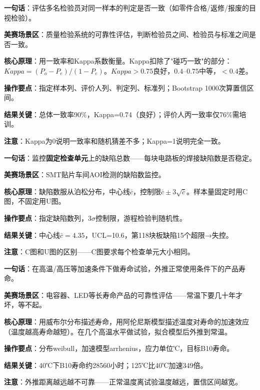 
\begin{algobrief}
\textbf{一句话}：评估多名检验员对同一样本的判定是否一致（如零件合格/返修/报废的目视检验）。

\textbf{美赛场景区}：质量检验系统的可靠性评估，判断检验员之间、检验员与标准之间是否一致。

\textbf{核心原理}：用一致率和Kappa系数衡量。Kappa扣除了"碰巧一致"的部分：$Kappa=(P_o-P_e)/(1-P_e)$。$Kappa>0.75$良好，$0.4$--$0.75$中等，$<0.4$差。

\textbf{操作要点}：指定样本列、评价人列、判定列、标准列；Bootstrap 1000次算置信区间。

\textbf{结果关键}：总体一致率90\%，Kappa=0.74（良好）；评价人丙一致率仅76\%需培训。

\textbf{注意}：Kappa为0说明一致率和随机猜差不多；Kappa=1说明完全一致。
\end{algobrief}


\begin{algobrief}
\textbf{一句话}：监控\textbf{固定检查单元}上的缺陷总数——每块电路板的焊接缺陷数是否稳定。

\textbf{美赛场景区}：SMT贴片车间AOI检测的缺陷数监控。

\textbf{核心原理}：缺陷数服从泊松分布，中心线$\bar{c}$，控制限$\bar{c}\pm3\sqrt{\bar{c}}$。样本量固定时用C图，不固定用U图。

\textbf{操作要点}：指定缺陷数列，3$\sigma$控制限，游程检验判随机性。

\textbf{结果关键}：中心线$\bar{c}=4.35$，UCL=10.6，第118块板缺陷15个超限→失控。

\textbf{注意}：C图和U图的区别——C图要求每个检查单元大小相同。
\end{algobrief}


\begin{algobrief}
\textbf{一句话}：在高温/高压等加速条件下做寿命试验，外推正常使用条件下的产品寿命。

\textbf{美赛场景区}：电容器、LED等长寿命产品的可靠性评估——常温下要几十年才坏，等不起。

\textbf{核心原理}：用威布尔分布描述寿命，用阿伦尼斯模型描述温度对寿命的加速效应（温度越高寿命越短）。在几个高温水平做试验，拟合模型后外推到常温。

\textbf{操作要点}：分布weibull，加速模型arrhenius，应力单位℃，目标B10寿命。

\textbf{结果关键}：40℃下B10寿命约28560小时；125℃比40℃加速349倍。

\textbf{注意}：外推距离越远越不可靠——正常温度离试验温度越远，置信区间越宽。
\end{algobrief}

